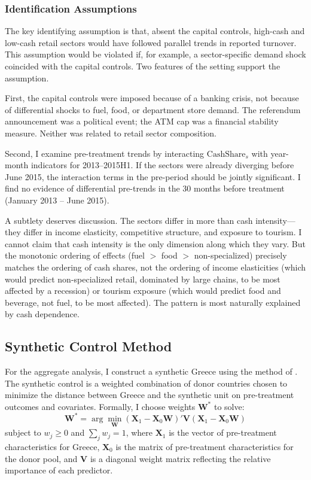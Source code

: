 \documentclass[12pt]{article}
\begin{document}
\subsubsection{Identification Assumptions}

The key identifying assumption is that, absent the capital controls, high-cash and low-cash retail sectors would have followed parallel trends in reported turnover. This assumption would be violated if, for example, a sector-specific demand shock coincided with the capital controls. Two features of the setting support the assumption.

First, the capital controls were imposed because of a banking crisis, not because of differential shocks to fuel, food, or department store demand. The referendum announcement was a political event; the ATM cap was a financial stability measure. Neither was related to retail sector composition.

Second, I examine pre-treatment trends by interacting $\text{CashShare}_s$ with year-month indicators for 2013--2015H1. If the sectors were already diverging before June 2015, the interaction terms in the pre-period should be jointly significant. I find no evidence of differential pre-trends in the 30 months before treatment (January 2013 -- June 2015).

A subtlety deserves discussion. The sectors differ in more than cash intensity---they differ in income elasticity, competitive structure, and exposure to tourism. I cannot claim that cash intensity is the only dimension along which they vary. But the monotonic ordering of effects (fuel $>$ food $>$ non-specialized) precisely matches the ordering of cash shares, not the ordering of income elasticities (which would predict non-specialized retail, dominated by large chains, to be most affected by a recession) or tourism exposure (which would predict food and beverage, not fuel, to be most affected). The pattern is most naturally explained by cash dependence.

\subsection{Synthetic Control Method}

For the aggregate analysis, I construct a synthetic Greece using the method of \citet{abadie2010synthetic}. The synthetic control is a weighted combination of donor countries chosen to minimize the distance between Greece and the synthetic unit on pre-treatment outcomes and covariates. Formally, I choose weights $\mathbf{W}^*$ to solve:
\begin{equation}
    \mathbf{W}^* = \arg\min_{\mathbf{W}} \left( \mathbf{X}_1 - \mathbf{X}_0 \mathbf{W} \right)' \mathbf{V} \left( \mathbf{X}_1 - \mathbf{X}_0 \mathbf{W} \right)
    \label{eq:scm}
\end{equation}
subject to $w_j \geq 0$ and $\sum_j w_j = 1$, where $\mathbf{X}_1$ is the vector of pre-treatment characteristics for Greece, $\mathbf{X}_0$ is the matrix of pre-treatment characteristics for the donor pool, and $\mathbf{V}$ is a diagonal weight matrix reflecting the relative importance of each predictor.
\end{document}
